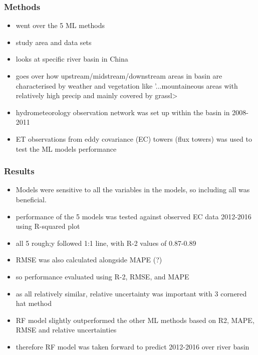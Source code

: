 \documentclass[paper=a4, fontsize=12pt]{scrartcl}
\begin{document}
	\subsubsection{Methods}
	\begin{itemize}
		\item went over the 5 ML methods  
		\item study area and data sets
		\item looks at specific river basin in China  
		\item goes over how upstream/midstream/downstream areas in basin are characterised by weather and vegetation like '...mountaineous areas with relatively high precip and mainly covered by grassl>
		\item hydrometeorology observation network was set up within the basin in 2008-2011  
		\item ET observations from eddy covariance (EC) towers (flux towers) was used to test the ML models performance   
	\end{itemize}
	
	\subsubsection{Results}
	\begin{itemize}
		\item Models were sensitive to all the variables in the models, so including all was beneficial.
		\item performance of the 5 models was tested against observed EC data 2012-2016 using R-squared plot  
		\item all 5 rough;y followed 1:1 line, with R-2 values of 0.87-0.89  
		\item RMSE was also calculated alongside MAPE (?)  
		\item so performance evaluated using R-2, RMSE, and MAPE  
		\item as all relatively similar, relative uncertainty was important with 3 cornered hat method  
		\item RF model slightly outperformed the other ML methods based on R2, MAPE, RMSE and relative uncertainties   
		\item therefore RF model was taken forward to predict 2012-2016 over river basin  
	\end{itemize}
	
\end{document}
